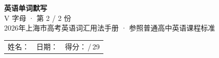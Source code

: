 \documentclass[10pt,a4paper]{article}
\begin{document}
\pagestyle{plain}

\begin{center}
{\LARGE\bfseries 英语单词默写}\\[0.22em]
{\large V 字母 · 第 2 / 2 份}\\[0.18em]
{\small 2026年上海市高考英语词汇用法手册 · 参照普通高中英语课程标准}
\end{center}

\vspace{0.25em}
\noindent\begin{tabular}{@{}p{}@{}p{}@{}p{}@{}}
姓名：\underline{\hspace{2.0cm}} & 日期：\underline{\hspace{2.0cm}} & 得分：\underline{\hspace{1.3cm}}\,/\,29 \\
\end{tabular}

\vspace{0.3em}

\vspace{0.08em}
\end{document}
